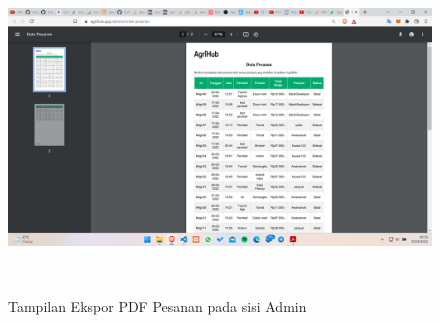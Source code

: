 \begin{enumerate}
\begin{enumerate}[a.]
		\begin{figure}[H]
			\centering
			{\includegraphics [width = 13.3cm, height= 8cm]{gambar/admin/export_pesanan_admin}}
			\caption{Tampilan Ekspor PDF Pesanan pada sisi Admin}
			\label{export_pesanan_admin}
		\end{figure}


\end{enumerate}
\end{enumerate}
